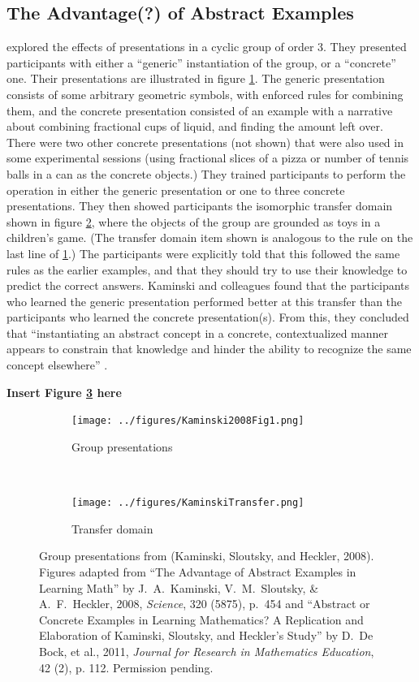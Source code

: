 \documentclass[man,10pt]{apa6}
\begin{document}
\subsection{The Advantage(?) of Abstract Examples}
 explored the effects of presentations in a cyclic group of order 3. They presented participants with either a ``generic'' instantiation of the group, or a ``concrete'' one. Their presentations are illustrated in figure \ref{kaminskitraining}. The generic presentation consists of some arbitrary geometric symbols, with enforced rules for combining them, and the concrete presentation consisted of an example with a narrative about combining fractional cups of liquid, and finding the amount left over. There were two other concrete presentations (not shown) that were also used in some experimental sessions (using fractional slices of a pizza or number of tennis balls in a can as the concrete objects.) They trained participants to perform the operation in either the generic presentation or one to three concrete presentations. They then showed participants the isomorphic transfer domain shown in figure \ref{kaminskitransfer}, where the objects of the group are grounded as toys in a children's game. (The transfer domain item shown is analogous to the rule on the last line of \ref{kaminskitraining}.) The participants were explicitly told that this followed the same rules as the earlier examples, and that they should try to use their knowledge to predict the correct answers. Kaminski and colleagues found that the participants who learned the generic presentation performed better at this transfer than the participants who learned the concrete presentation(s). From this, they concluded that ``instantiating an abstract concept in a concrete, contextualized manner appears to constrain that knowledge and hinder the ability to recognize the same concept elsewhere'' \cite{Kaminski2008}. \par
\begin{center} 
{\bf Insert Figure \ref{kaminskipresentations} here} 
\end{center}
\begin{figure} \centering \begin{subfigure}{0.5\textwidth} \caption{Group presentations} \label{kaminskitraining} \texttt{[image: ../figures/Kaminski2008Fig1.png]} \end{subfigure} \\ \begin{subfigure}{0.5\textwidth} \caption{Transfer domain} \label{kaminskitransfer} \texttt{[image: ../figures/KaminskiTransfer.png]} \end{subfigure} \caption{Group presentations from (Kaminski, Sloutsky, and Heckler, 2008). Figures adapted from ``The Advantage of Abstract Examples in Learning Math'' by J.\ A.\ Kaminski, V.\ M.\ Sloutsky, \& A.\ F.\ Heckler, 2008,  \textit{Science}, 320 (5875), p.\ 454 and ``Abstract or Concrete Examples in Learning Mathematics? A Replication and Elaboration of Kaminski, Sloutsky, and Heckler's Study'' by D.\ De Bock, et al., 2011, \textit{Journal for Research in Mathematics Education}, 42 (2), p. 112.  Permission pending.} 
\label{kaminskipresentations}
\end{figure}
\end{document}
